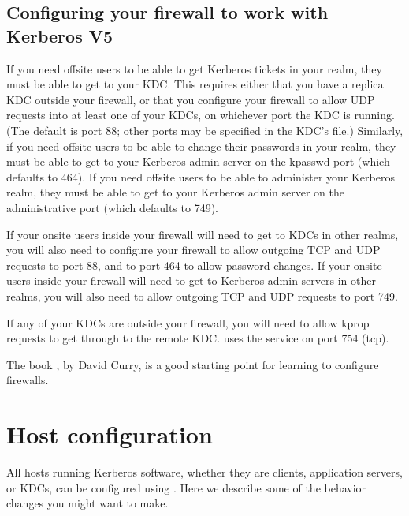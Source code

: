 \documentclass[letterpaper,10pt,english]{sphinxmanual}
\begin{document}
\section{Configuring your firewall to work with Kerberos V5}
\label{\detokenize{admin/appl_servers:configuring-your-firewall-to-work-with-kerberos-v5}}\label{\detokenize{admin/appl_servers:conf-firewall}}
\sphinxAtStartPar
If you need off\sphinxhyphen{}site users to be able to get Kerberos tickets in your
realm, they must be able to get to your KDC.  This requires either
that you have a replica KDC outside your firewall, or that you
configure your firewall to allow UDP requests into at least one of
your KDCs, on whichever port the KDC is running.  (The default is port
88; other ports may be specified in the KDC’s {\hyperref[\detokenize{admin/conf_files/kdc_conf:kdc-conf-5}]{}}
file.)  Similarly, if you need off\sphinxhyphen{}site users to be able to change
their passwords in your realm, they must be able to get to your
Kerberos admin server on the kpasswd port (which defaults to 464).  If
you need off\sphinxhyphen{}site users to be able to administer your Kerberos realm,
they must be able to get to your Kerberos admin server on the
administrative port (which defaults to 749).

\sphinxAtStartPar
If your on\sphinxhyphen{}site users inside your firewall will need to get to KDCs in
other realms, you will also need to configure your firewall to allow
outgoing TCP and UDP requests to port 88, and to port 464 to allow
password changes.  If your on\sphinxhyphen{}site users inside your firewall will
need to get to Kerberos admin servers in other realms, you will also
need to allow outgoing TCP and UDP requests to port 749.

\sphinxAtStartPar
If any of your KDCs are outside your firewall, you will need to allow
kprop requests to get through to the remote KDC.  {\hyperref[\detokenize{admin/admin_commands/kprop:kprop-8}]{}} uses
the  service on port 754 (tcp).

\sphinxAtStartPar
The book , by David Curry, is a good starting
point for learning to configure firewalls.

\sphinxstepscope


\chapter{Host configuration}
\label{\detokenize{admin/host_config:host-configuration}}\label{\detokenize{admin/host_config::doc}}
\sphinxAtStartPar
All hosts running Kerberos software, whether they are clients,
application servers, or KDCs, can be configured using
{\hyperref[\detokenize{admin/conf_files/krb5_conf:krb5-conf-5}]{}}.  Here we describe some of the behavior changes
you might want to make.
\end{document}
